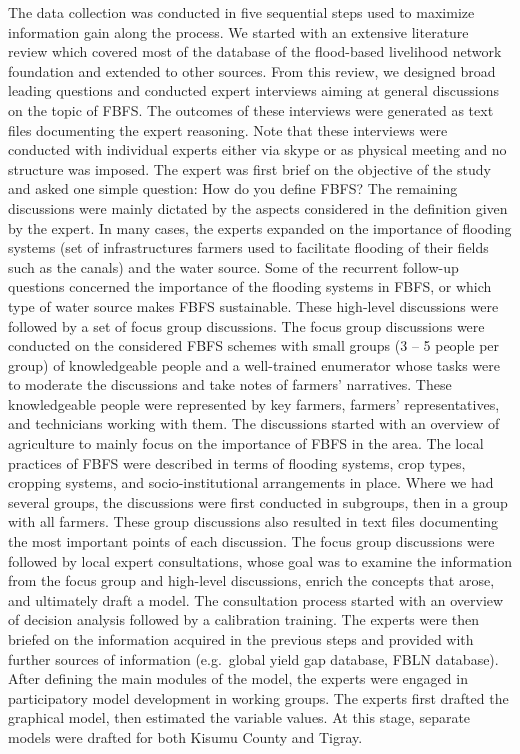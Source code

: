 \documentclass[]{elsarticle} %
\begin{document}
The data collection was conducted in five sequential steps used to maximize information gain along the process. We started with an extensive literature review which covered most of the database of the flood-based livelihood network foundation and extended to other sources. From this review, we designed broad leading questions and conducted expert interviews aiming at general discussions on the topic of FBFS. The outcomes of these interviews were generated as text files documenting the expert reasoning. Note that these interviews were conducted with individual experts either via skype or as physical meeting and no structure was imposed. The expert was first brief on the objective of the study and asked one simple question: How do you define FBFS? The remaining discussions were mainly dictated by the aspects considered in the definition given by the expert. In many cases, the experts expanded on the importance of flooding systems (set of infrastructures farmers used to facilitate flooding of their fields such as the canals) and the water source. Some of the recurrent follow-up questions concerned the importance of the flooding systems in FBFS, or which type of water source makes FBFS sustainable. These high-level discussions were followed by a set of focus group discussions.
The focus group discussions were conducted on the considered FBFS schemes with small groups (3 -- 5 people per group) of knowledgeable people and a well-trained enumerator whose tasks were to moderate the discussions and take notes of farmers' narratives. These knowledgeable people were represented by key farmers, farmers' representatives, and technicians working with them. The discussions started with an overview of agriculture to mainly focus on the importance of FBFS in the area. The local practices of FBFS were described in terms of flooding systems, crop types, cropping systems, and socio-institutional arrangements in place. Where we had several groups, the discussions were first conducted in subgroups, then in a group with all farmers. These group discussions also resulted in text files documenting the most important points of each discussion.
The focus group discussions were followed by local expert consultations, whose goal was to examine the information from the focus group and high-level discussions, enrich the concepts that arose, and ultimately draft a model. The consultation process started with an overview of decision analysis followed by a calibration training. The experts were then briefed on the information acquired in the previous steps and provided with further sources of information (e.g.~global yield gap database, FBLN database). After defining the main modules of the model, the experts were engaged in participatory model development in working groups. The experts first drafted the graphical model, then estimated the variable values. At this stage, separate models were drafted for both Kisumu County and Tigray.
\end{document}

